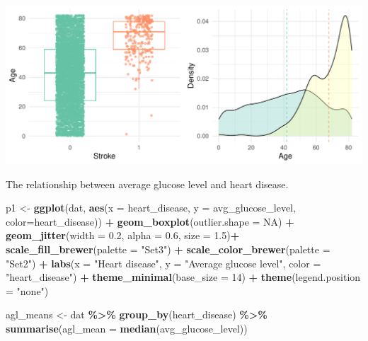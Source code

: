 \documentclass[
]{article}
\newenvironment{Shaded}{\begin{snugshade}}{\end{snugshade}}
\newcommand{\AttributeTok}[1]{\textcolor[rgb]{0.13,0.29,0.53}{#1}}
\newcommand{\ConstantTok}[1]{\textcolor[rgb]{0.56,0.35,0.01}{#1}}
\newcommand{\DecValTok}[1]{\textcolor[rgb]{0.00,0.00,0.81}{#1}}
\newcommand{\FloatTok}[1]{\textcolor[rgb]{0.00,0.00,0.81}{#1}}
\newcommand{\FunctionTok}[1]{\textcolor[rgb]{0.13,0.29,0.53}{\textbf{#1}}}
\newcommand{\NormalTok}[1]{#1}
\newcommand{\OtherTok}[1]{\textcolor[rgb]{0.56,0.35,0.01}{#1}}
\newcommand{\SpecialCharTok}[1]{\textcolor[rgb]{0.81,0.36,0.00}{\textbf{#1}}}
\newcommand{\StringTok}[1]{\textcolor[rgb]{0.31,0.60,0.02}{#1}}
\begin{document}
\includegraphics{Build-deploy-stroke-prediction-model-R_files/figure-latex/age-stroke-plot-1.pdf}

The relationship between average glucose level and heart disease.

\begin{Shaded}
\begin{Highlighting}[]
\NormalTok{p1 }\OtherTok{\textless{}{-}} \FunctionTok{ggplot}\NormalTok{(dat, }\FunctionTok{aes}\NormalTok{(}\AttributeTok{x =}\NormalTok{ heart\_disease, }\AttributeTok{y =}\NormalTok{ avg\_glucose\_level, }\AttributeTok{color=}\NormalTok{heart\_disease)) }\SpecialCharTok{+} 
      \FunctionTok{geom\_boxplot}\NormalTok{(}\AttributeTok{outlier.shape =} \ConstantTok{NA}\NormalTok{) }\SpecialCharTok{+}
      \FunctionTok{geom\_jitter}\NormalTok{(}\AttributeTok{width =} \FloatTok{0.2}\NormalTok{, }\AttributeTok{alpha =} \FloatTok{0.6}\NormalTok{, }\AttributeTok{size =} \FloatTok{1.5}\NormalTok{)}\SpecialCharTok{+}
      \FunctionTok{scale\_fill\_brewer}\NormalTok{(}\AttributeTok{palette =} \StringTok{"Set3"}\NormalTok{) }\SpecialCharTok{+}
      \FunctionTok{scale\_color\_brewer}\NormalTok{(}\AttributeTok{palette =} \StringTok{"Set2"}\NormalTok{) }\SpecialCharTok{+}
      \FunctionTok{labs}\NormalTok{(}\AttributeTok{x =} \StringTok{"Heart disease"}\NormalTok{, }\AttributeTok{y =} \StringTok{"Average glucose level"}\NormalTok{, }\AttributeTok{color =} \StringTok{"heart\_disease"}\NormalTok{) }\SpecialCharTok{+}
      \FunctionTok{theme\_minimal}\NormalTok{(}\AttributeTok{base\_size =} \DecValTok{14}\NormalTok{) }\SpecialCharTok{+}
      \FunctionTok{theme}\NormalTok{(}\AttributeTok{legend.position =} \StringTok{"none"}\NormalTok{)  }


\NormalTok{agl\_means }\OtherTok{\textless{}{-}}\NormalTok{ dat }\SpecialCharTok{\%\textgreater{}\%} \FunctionTok{group\_by}\NormalTok{(heart\_disease) }\SpecialCharTok{\%\textgreater{}\%} \FunctionTok{summarise}\NormalTok{(}\AttributeTok{agl\_mean =} \FunctionTok{median}\NormalTok{(avg\_glucose\_level)) }


\end{Highlighting}
\end{Shaded}
\end{document}
